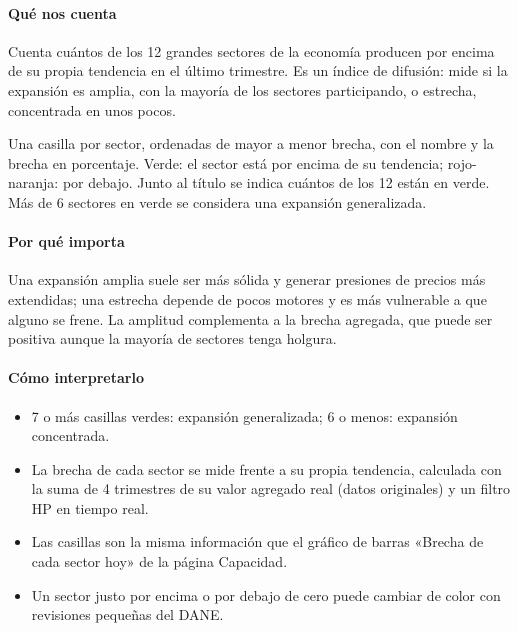 \paragraph{Qué nos cuenta}
Cuenta cuántos de los 12 grandes sectores de la economía producen por encima de su propia tendencia en el último trimestre. Es un índice de difusión: mide si la expansión es amplia, con la mayoría de los sectores participando, o estrecha, concentrada en unos pocos.

\begin{leer}
Una casilla por sector, ordenadas de mayor a menor brecha, con el nombre y la brecha en porcentaje. Verde: el sector está por encima de su tendencia; rojo-naranja: por debajo. Junto al título se indica cuántos de los 12 están en verde. Más de 6 sectores en verde se considera una expansión generalizada.
\end{leer}

\paragraph{Por qué importa}
Una expansión amplia suele ser más sólida y generar presiones de precios más extendidas; una estrecha depende de pocos motores y es más vulnerable a que alguno se frene. La amplitud complementa a la brecha agregada, que puede ser positiva aunque la mayoría de sectores tenga holgura.

\paragraph{Cómo interpretarlo}
\begin{itemize}
\item 7 o más casillas verdes: expansión generalizada; 6 o menos: expansión concentrada.
\item La brecha de cada sector se mide frente a su propia tendencia, calculada con la suma de 4 trimestres de su valor agregado real (datos originales) y un filtro HP en tiempo real.
\item Las casillas son la misma información que el gráfico de barras «Brecha de cada sector hoy» de la página Capacidad.
\item Un sector justo por encima o por debajo de cero puede cambiar de color con revisiones pequeñas del DANE.
\end{itemize}
\begin{formulas}[Fórmulas]
\end{formulas}

